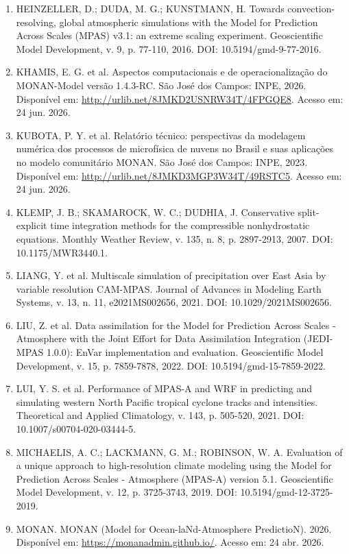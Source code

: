 \documentclass[12pt,a4paper,oneside]{book}
\begin{document}
\begin{enumerate}
\item
  HEINZELLER, D.; DUDA, M. G.; KUNSTMANN, H. Towards convection-resolving, global atmospheric simulations with the Model for Prediction Across Scales (MPAS) v3.1: an extreme scaling experiment. Geoscientific Model Development, v. 9, p. 77-110, 2016. DOI: 10.5194/gmd-9-77-2016.
\item
  KHAMIS, E. G. et al. Aspectos computacionais e de operacionalização do MONAN-Model versão 1.4.3-RC. São José dos Campos: INPE, 2026. Disponível em: \url{http://urlib.net/8JMKD2USNRW34T/4FPGQE8}. Acesso em: 24 jun. 2026.
\item
  KUBOTA, P. Y. et al. Relatório técnico: perspectivas da modelagem numérica dos processos de microfísica de nuvens no Brasil e suas aplicações no modelo comunitário MONAN. São José dos Campos: INPE, 2023. Disponível em: \url{http://urlib.net/8JMKD3MGP3W34T/49RSTC5}. Acesso em: 24 jun. 2026.
\item
  KLEMP, J. B.; SKAMAROCK, W. C.; DUDHIA, J. Conservative split-explicit time integration methods for the compressible nonhydrostatic equations. Monthly Weather Review, v. 135, n. 8, p. 2897-2913, 2007. DOI: 10.1175/MWR3440.1.
\item
  LIANG, Y. et al. Multiscale simulation of precipitation over East Asia by variable resolution CAM-MPAS. Journal of Advances in Modeling Earth Systems, v. 13, n. 11, e2021MS002656, 2021. DOI: 10.1029/2021MS002656.
\item
  LIU, Z. et al. Data assimilation for the Model for Prediction Across Scales - Atmosphere with the Joint Effort for Data Assimilation Integration (JEDI-MPAS 1.0.0): EnVar implementation and evaluation. Geoscientific Model Development, v. 15, p. 7859-7878, 2022. DOI: 10.5194/gmd-15-7859-2022.
\item
  LUI, Y. S. et al. Performance of MPAS-A and WRF in predicting and simulating western North Pacific tropical cyclone tracks and intensities. Theoretical and Applied Climatology, v. 143, p. 505-520, 2021. DOI: 10.1007/s00704-020-03444-5.
\item
  MICHAELIS, A. C.; LACKMANN, G. M.; ROBINSON, W. A. Evaluation of a unique approach to high-resolution climate modeling using the Model for Prediction Across Scales - Atmosphere (MPAS-A) version 5.1. Geoscientific Model Development, v. 12, p. 3725-3743, 2019. DOI: 10.5194/gmd-12-3725-2019.
\item
  MONAN. MONAN (Model for Ocean-laNd-Atmosphere PredictioN). 2026. Disponível em: \url{https://monanadmin.github.io/}. Acesso em: 24 abr. 2026.

\end{enumerate}
\end{document}
